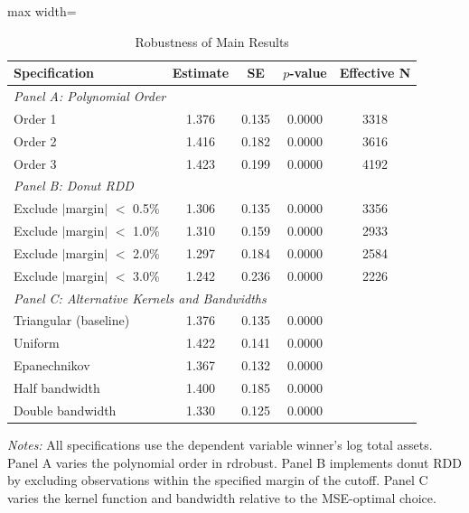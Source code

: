 \begin{table}[htbp]
\centering
\caption{Robustness of Main Results}
\label{tab:robustness}
\begin{adjustbox}{max width=\textwidth}
\begin{tabular}{lcccc}
\hline\hline
Specification & Estimate & SE & $p$-value & Effective N \\
\hline
\multicolumn{5}{l}{\textit{Panel A: Polynomial Order}} \\
Order 1 & 1.376 & 0.135 & 0.0000 & 3318 \\
Order 2 & 1.416 & 0.182 & 0.0000 & 3616 \\
Order 3 & 1.423 & 0.199 & 0.0000 & 4192 \\
[0.3em]
\multicolumn{5}{l}{\textit{Panel B: Donut RDD}} \\
Exclude $|$margin$|$ $<$ 0.5\% & 1.306 & 0.135 & 0.0000 & 3356 \\
Exclude $|$margin$|$ $<$ 1.0\% & 1.310 & 0.159 & 0.0000 & 2933 \\
Exclude $|$margin$|$ $<$ 2.0\% & 1.297 & 0.184 & 0.0000 & 2584 \\
Exclude $|$margin$|$ $<$ 3.0\% & 1.242 & 0.236 & 0.0000 & 2226 \\
[0.3em]
\multicolumn{5}{l}{\textit{Panel C: Alternative Kernels and Bandwidths}} \\
Triangular (baseline) & 1.376 & 0.135 & 0.0000 & \\
Uniform & 1.422 & 0.141 & 0.0000 & \\
Epanechnikov & 1.367 & 0.132 & 0.0000 & \\
Half bandwidth & 1.400 & 0.185 & 0.0000 & \\
Double bandwidth & 1.330 & 0.125 & 0.0000 & \\
\hline\hline
\end{tabular}
\end{adjustbox}
\begin{minipage}{0.95\textwidth}
\footnotesize
\textit{Notes:} All specifications use the dependent variable winner's log total assets. Panel A varies the polynomial order in rdrobust. Panel B implements donut RDD by excluding observations within the specified margin of the cutoff. Panel C varies the kernel function and bandwidth relative to the MSE-optimal choice.
\end{minipage}
\end{table}
